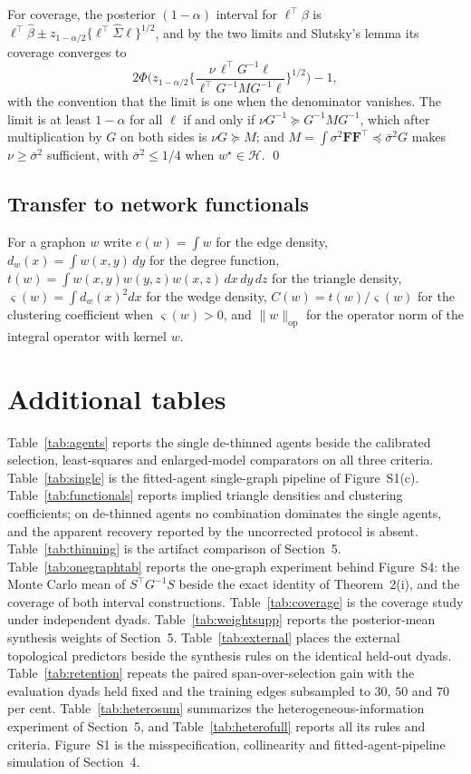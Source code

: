 \documentclass[12pt]{article}
\newcommand{\calH}{\mathcal{H}}
\newcommand{\norm}[1]{\|#1\|}
\newcommand{\wstar}{w^{\star}}
\newcommand{\bhat}{\hat\beta}
\newcommand{\Sighat}{\hat\Sigma}
\newcommand{\Fv}{\mathbf{F}}
\begin{document}
For coverage, the posterior $(1-\alpha)$ interval for $\ell^{\top}\beta$ is $\ell^{\top}\bhat\pm z_{1-\alpha/2}\{\ell^{\top}\Sighat\ell\}^{1/2}$, and by the two limits and Slutsky's lemma its coverage converges to
\[
2\Phi\Big(z_{1-\alpha/2}\Big\{\frac{\nu\,\ell^{\top}G^{-1}\ell}{\ell^{\top}G^{-1}MG^{-1}\ell}\Big\}^{1/2}\Big)-1,
\]
with the convention that the limit is one when the denominator vanishes. The limit is at least $1-\alpha$ for all $\ell$ if and only if $\nu G^{-1}\succeq G^{-1}MG^{-1}$, which after multiplication by $G$ on both sides is $\nu G\succeq M$; and $M=\int\sigma^2\Fv\Fv^{\top}\preceq\bar\sigma^2G$ makes $\nu\ge\bar\sigma^2$ sufficient, with $\bar\sigma^2\le1/4$ when $\wstar\in\calH$. \qed

\subsection*{Transfer to network functionals}

For a graphon $w$ write $e(w)=\int w$ for the edge density, $d_w(x)=\int w(x,y)\,dy$ for the degree function, $t(w)=\int w(x,y)w(y,z)w(x,z)\,dx\,dy\,dz$ for the triangle density, $\varsigma(w)=\int d_w(x)^2dx$ for the wedge density, $C(w)=t(w)/\varsigma(w)$ for the clustering coefficient when $\varsigma(w)>0$, and $\norm{w}_{\mathrm{op}}$ for the operator norm of the integral operator with kernel $w$.

\section{Additional tables}
\label{sec:tables}

Table~\ref{tab:agents} reports the single de-thinned agents beside the calibrated selection, least-squares and enlarged-model comparators on all three criteria. Table~\ref{tab:single} is the fitted-agent single-graph pipeline of Figure~S1(c). Table~\ref{tab:functionals} reports implied triangle densities and clustering coefficients; on de-thinned agents no combination dominates the single agents, and the apparent recovery reported by the uncorrected protocol is absent. Table~\ref{tab:thinning} is the artifact comparison of Section~5. Table~\ref{tab:onegraphtab} reports the one-graph experiment behind Figure~S4: the Monte Carlo mean of $S^{\top}G^{-1}S$ beside the exact identity of Theorem~2(i), and the coverage of both interval constructions. Table~\ref{tab:coverage} is the coverage study under independent dyads. Table~\ref{tab:weightsupp} reports the posterior-mean synthesis weights of Section~5. Table~\ref{tab:external} places the external topological predictors beside the synthesis rules on the identical held-out dyads. Table~\ref{tab:retention} repeats the paired span-over-selection gain with the evaluation dyads held fixed and the training edges subsampled to $30$, $50$ and $70$ per cent. Table~\ref{tab:heterosum} summarizes the heterogeneous-information experiment of Section~5, and Table~\ref{tab:heterofull} reports all its rules and criteria. Figure~S1 is the misspecification, collinearity and fitted-agent-pipeline simulation of Section~4.
\end{document}
